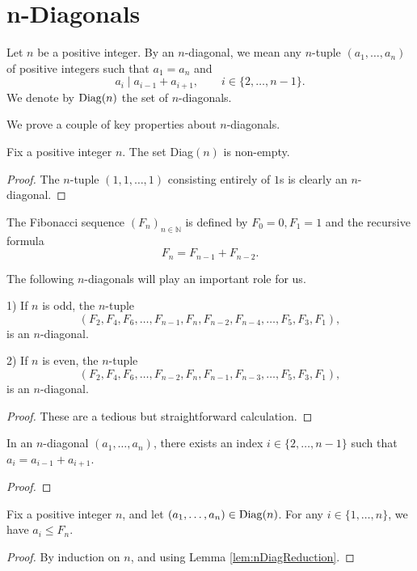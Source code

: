 
\chapter{n-Diagonals}
\begin{definition}
    \label{def:nDiag}
    Let $n$ be a positive integer. By an $n$-diagonal, we mean any $n$-tuple $(a_1,\ldots, a_n)$ of positive integers 
    such that $a_1 = a_n$ and 
    \[
        a_i \mid a_{i-1} + a_{i+1}, \qquad i \in \{2, \ldots, n-1\}.
    \]
    We denote by ${\rm Diag}(n)$ the set of $n$-diagonals.
\end{definition}

We prove a couple of key properties about $n$-diagonals. 
\begin{lemma}
    \label{l:nDiagNonEmpty}
    Fix a positive integer $n$. The set Diag$(n)$ is non-empty.
\end{lemma}
\begin{proof}
    The $n$-tuple $(1,1,\ldots, 1)$ consisting entirely of $1$s is clearly an $n$-diagonal.
\end{proof}

\begin{definition}
    \label{def:fib}
    The Fibonacci sequence $(F_n)_{n \in \mathbb{N}}$ is defined by $F_0 = 0, F_1 = 1$ and the recursive formula
    \[
        F_n = F_{n-1} + F_{n-2}.
    \]
\end{definition}

The following $n$-diagonals will play an important role for us.
\begin{lemma}
    \label{l:FibDiag}
    1) If $n$ is odd, the $n$-tuple 
    \[
        (F_2,F_4, F_6, \ldots, F_{n-1}, F_{n}, F_{n-2}, F_{n-4}, \ldots, F_5, F_3, F_1), 
    \]
    is an $n$-diagonal.

    2) If $n$ is even, the $n$-tuple 
    \[
        (F_2, F_4, F_6, \ldots, F_{n-2}, F_{n}, F_{n-1}, F_{n-3}, \ldots, F_5, F_3,F_1),
    \]
    is an $n$-diagonal. 
\end{lemma}
\begin{proof}
    These are a tedious but straightforward calculation.
\end{proof}

\begin{lemma}
    \label{lem:nDiagReduction}
    In an $n$-diagonal $(a_1, \ldots, a_n)$, there exists an index $i \in \{2,\ldots, n-1\}$ 
    such that $a_i = a_{i-1} + a_{i+1}$.
\end{lemma}
\begin{proof}

\end{proof}

\begin{proposition}
    \label{prop:nDiagFinite}
    Fix a positive integer $n$, and let $(a_1, \ldots, a_n) \in {\rm Diag}(n)$. 
    For any $i \in \{1,\ldots, n\}$, we have $a_i \leq F_n$. 
\end{proposition}
\begin{proof}
   By induction on $n$, and using Lemma \ref{lem:nDiagReduction}.
\end{proof}
